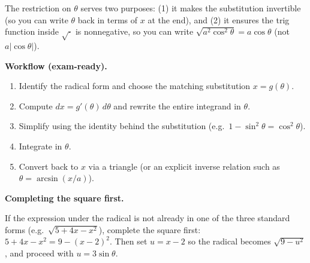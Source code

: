 The restriction on $\theta$ serves two purposes: (1) it makes the substitution invertible (so you can write $\theta$ back in terms of $x$ at the end), and (2) it ensures the trig function inside $\sqrt{\cdot}$ is nonneg\-ative, so you can write $\sqrt{a^2\cos^2\theta}=a\cos\theta$ (not $a|\cos\theta|$).

\noindent
\textbf{Workflow (exam-ready).}

\begin{enumerate}[label=(\arabic*)]
\item Identify the radical form and choose the matching substitution $x=g(\theta)$.
\item Compute $dx=g'(\theta)\,d\theta$ and rewrite the entire integrand in $\theta$.
\item Simplify using the identity behind the substitution (e.g.\ $1-\sin^2\theta=\cos^2\theta$).
\item Integrate in $\theta$.
\item Convert back to $x$ via a triangle (or an explicit inverse relation such as $\theta=\arcsin(x/a)$).
\end{enumerate}

\textbf{Completing the square first.}

If the expression under the radical is not already in one of the three standard forms (e.g.\ $\sqrt{5+4x-x^2}$), complete the square first: $5+4x-x^2 = 9-(x-2)^2$. Then set $u=x-2$ so the radical becomes $\sqrt{9-u^2}$, and proceed with $u=3\sin\theta$.


\begin{center}
\end{center}

